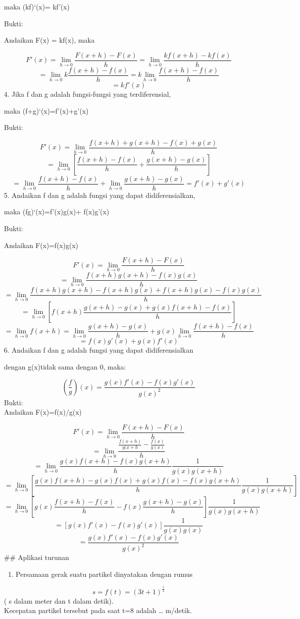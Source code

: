 \documentclass[
]{book}
\providecommand{\tightlist}{%
  \setlength{\itemsep}{0pt}\setlength{\parskip}{0pt}}
\begin{document}
maka (kf)`(x)= kf'(x)

Bukti:

Andaikan F(x) = kf(x), maka

\[F'(x)=\lim_{h\to 0}\frac{F(x+h)-F(x)}{h}=\lim_{h\to 0}\frac{kf(x+h)-kf(x)}{h}\]\[    = \lim_{h\to 0}k \frac{f(x+h)-f(x)}{h}=k\lim_{h\to 0}\frac{f(x+h)-f(x)}{h}\]\[= kf'(x)\]4. Jika f dan g adalah fungsi-fungsi yang terdiferensial,

maka (f+g)`(x)=f'(x)+g'(x)

Bukti:

\[F'(x)=\lim_{h\to 0}\frac{f(x+h)+g(x+h)-f(x)+g(x)}{h}\]\[=\lim_{h\to 0}[\frac{f(x+h)-f(x)}{h}+\frac{g(x+h)-g(x)}{h}]\]\[=\lim_{h\to 0}\frac{f(x+h)-f(x)}{h}+\lim_{h\to 0}\frac{g(x+h)-g(x)}{h}=f'(x)+g'(x)\]5. Andaikan f dan g adalah fungsi yang dapat didiferensialkan,

maka (fg)`(x)=f'(x)g(x)+ f(x)g'(x)

Bukti:

Andaikan F(x)=f(x)g(x)

\[F'(x)= \lim_{h\to 0}\frac{F(x+h)-F(x)}{h}\]\[= \lim_{h\to 0}\frac{f(x+h)g(x+h)-f(x)g(x)}{h}\]\[= \lim_{h\to 0}\frac{f(x+h)g(x+h)-f(x+h)g(x)+f(x+h)g(x)-f(x)g(x)}{h}\]\[=\lim_{h\to 0}[f(x+h)\frac{g(x+h)-g(x)+g(x)f(x+h)-f(x)}{h}]\]\[=\lim_{h\to 0} f(x+h)=\lim_{h \to 0}\frac{g(x+h)-g(x)}{h}+g(x)\lim_{h\to 0}\frac{f(x+h)-f(x)}{h}\]\[=f(x)g'(x)+g(x)f'(x)\]6. Andaikan f dan g adalah fungsi yang dapat didiferensialkan

dengan g(x)tidak sama dengan 0, maka:

\[(\frac{f}{g})(x)=\frac{g(x)f'(x)-f(x)g'(x)}{g(x)^2}\] Bukti:\\
Andaikan F(x)=f(x)/g(x)

\[F'(x)= \lim_{h\to 0}\frac{F(x+h)-F(x)}{h}\]\[= \lim_{h\to 0}\frac{\frac{f(x+h)}{g(x+h}-\frac{f(x)}{g(x)}}{h}\]\[= \lim_{h\to 0}\frac{g(x)f(x+h)-f(x)g(x+h)}{h}\frac{1}{g(x)g(x+h)}\]\[= \lim_{h\to 0}[\frac{g(x)f(x+h)-g(x)f(x)+g(x)f(x)-f(x)g(x+h)}{h}\frac{1}{g(x)g(x+h)}]\]\[=\lim_{h\to 0} [g(x)\frac{f(x+h)-f(x)}{h}-f(x)\frac{g(x+h)-g(x)}{h}]\frac{1}{g(x)g(x+h)}\]\[=[g(x)f'(x)-f(x)g'(x)]\frac{1}{g(x)g(x)}\]\[=\frac{g(x)f'(x)-f(x)g'(x)}{g(x)^2}\]\#\# Aplikasi turunan

\begin{enumerate}
\def\labelenumi{\arabic{enumi}.}
\tightlist
\item
  Persamaan gerak suatu partikel dinyatakan dengan rumus
\end{enumerate}

\[s=f(t)=(3t+1)^{\frac{1}{2}}\] ( s dalam meter dan t dalam detik).\\
Kecepatan partikel tersebut pada saat t=8 adalah \ldots{} m/detik.
\end{document}
